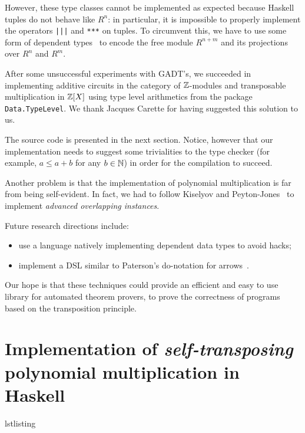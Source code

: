 However, these type classes cannot be implemented as expected because
Haskell tuples do not behave like $R^n$: in particular, it is
impossible to properly implement the operators \lstinline+|||+ and
\lstinline+***+ on tuples. To circumvent this, we have to use some
form of dependent types~\cite{kiselyov+lammel+schupke04,mcbride01} to
encode the free module $R^{n+m}$ and its projections over $R^n$ and
$R^m$.

After some unsuccessful experiments with GADT's, we succeeded in
implementing additive circuits in the category of $\mathbb{Z}$-modules and
transposable multiplication in $\mathbb{Z}[X]$ using type level arithmetics
from the package \lstinline+Data.TypeLevel+. We thank Jacques Carette
for having suggested this solution to us.

The source code is presented in the next section. Notice, however that
our implementation needs to suggest some trivialities to the type
checker (for example, $a\le a+b$ for any $b\in\mathbb{N}$) in order for the
compilation to succeed. 

Another problem is that the implementation of polynomial
multiplication is far from being self-evident. In fact, we had to
follow Kiselyov and
Peyton-Jones~\cite{jones+kiselyov:advanced+overlap08} to implement
\emph{advanced overlapping instances}.

Future research directions include:
\begin{itemize}
\item use a language natively implementing dependent data types to
  avoid hacks;
\item implement a DSL similar to Paterson's do-notation for
  arrows~\cite{paterson01}.
\end{itemize}
Our hope is that these techniques could provide an efficient and easy
to use library for automated theorem provers, to prove the correctness
of programs based on the transposition principle.


\section[\emph{Self-transposing} polynomial
multiplication]{Implementation of \emph{self-transposing} polynomial
  multiplication in Haskell}
\label{sec:impl-emphs-transp}

\begin{xcomment}{lstlisting}

\end{xcomment}



\renewcommand{\C}{\mathbb{C}}



%
